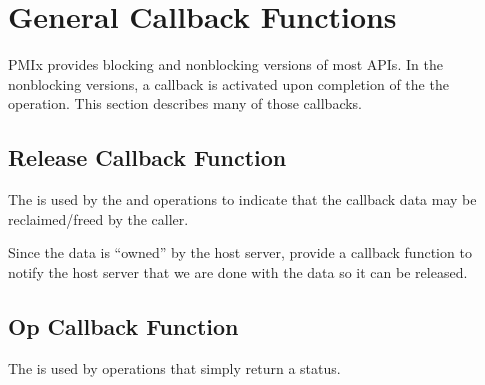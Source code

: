 \section{General Callback Functions}

PMIx provides blocking and nonblocking versions of most APIs.
In the nonblocking versions, a callback is activated upon completion of the the operation.
This section describes many of those callbacks.

\subsection{Release Callback Function}

\summary

The  is used by the  and  operations to indicate that the callback data may be reclaimed/freed by the caller.

\format


\begin{arglist}
\end{arglist}

\descr

Since the data is ``owned'' by the host server, provide a callback function to notify the host server that we are done with the data so it can be released.


\subsection{Op Callback Function}

\summary

The  is used by operations that simply return a status.


